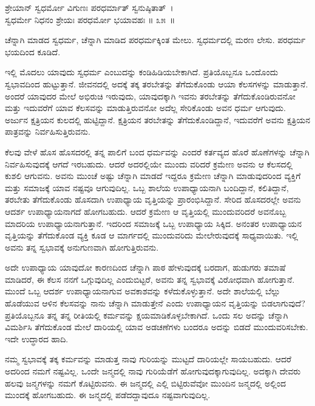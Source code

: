\begin{shloka}
ಶ್ರೇಯಾನ್ ಸ್ವಧರ್ಮೋ ವಿಗುಣಃ ಪರಧರ್ಮಾತ್ ಸ್ವನುಷ್ಠಿತಾತ್~।\\ಸ್ವಧರ್ಮೇ ನಿಧನಂ ಶ್ರೇಯಃ ಪರಧರ್ಮೋ ಭಯಾವಹಃ \hfill॥ ೩೫~॥
\end{shloka}

\newpage

\begin{artha}
ಚೆನ್ನಾಗಿ ಮಾಡದ ಸ್ವಧರ್ಮ, ಚೆನ್ನಾಗಿ ಮಾಡಿದ ಪರಧರ್ಮಕ್ಕಿಂತ ಮೇಲು. ಸ್ವಧರ್ಮದಲ್ಲಿ ಮರಣ ಲೇಸು. ಪರಧರ್ಮ ಭಯದಿಂದ ಕೂಡಿದೆ.
\end{artha}

ಇಲ್ಲಿ ಮೊದಲು ಯಾವುದು ಸ್ವಧರ್ಮ ಎಂಬುದನ್ನು ಕಂಡಿಹಿಡಿಯಬೇಕಾಗಿದೆ. ಪ್ರತಿ\-ಯೊಬ್ಬನೂ ಒಂದೊಂದು ಸ್ವಭಾವದಿಂದ ಹುಟ್ಟುತ್ತಾನೆ. ಜೀವನದಲ್ಲಿ ಅದಕ್ಕೆ ತಕ್ಕ ತರಬೇತನ್ನು ತೆಗೆದುಕೊಂಡು ಆಯಾ ಕೆಲಸಗಳನ್ನು ಮಾಡುತ್ತಾನೆ. ಅಂದರೆ ಯಾವುದರ ಮೇಲೆ ಅಭಿರುಚಿ ಇರುವುದು, ಯಾವುದಕ್ಕಾಗಿ ಇವನು ತರಬೇತನ್ನು ತೆಗೆದುಕೊಂಡಿರುವನೋ ಮತ್ತು ಇದುವರೆಗೆ ಯಾವ ಕೆಲಸವನ್ನು ಮಾಡುತ್ತಿರುವನೋ ಅದೆಲ್ಲ ಸೇರಿಕೊಂಡು ಅವನ ಧರ್ಮ ಆಗುವುದು. ಅರ್ಜುನ ಕ್ಷತ್ರಿಯನ ಕುಲದಲ್ಲಿ ಹುಟ್ಟಿದ್ದಾನೆ. ಕ್ಷತ್ರಿಯನ ತರಬೇತನ್ನು ತೆಗೆದುಕೊಂಡಿದ್ದಾನೆ, ಇದುವರೆಗೆ ಅವನು ಕ್ಷತ್ರಿಯನ ಪಾತ್ರವನ್ನು ನಿರ್ವಹಿಸುತ್ತಿರುವನು.

ಕೆಲವು ವೇಳೆ ಹೊಸ ಹೊಸದರಲ್ಲಿ ತನ್ನ ಪಾಲಿಗೆ ಬಂದ ಧರ್ಮವನ್ನು ಎಂದರೆ ಕರ್ತವ್ಯದ ಹೊರೆ ಹೊಣೆಗಳನ್ನು ಚೆನ್ನಾಗಿ ನಿರ್ವಹಿಸುವುದಕ್ಕೆ ಆಗದೆ ಇರಬಹುದು. ಆದರೆ ಅದರಲ್ಲಿಯೇ ಮುಂದು ವರಿದರೆ ಕ್ರಮೇಣ ಅವನು ಆ ಕೆಲಸದಲ್ಲಿ ಕುಶಲಿ ಆಗುವನು. ಅವನು ಮುಂಚೆ ಅಷ್ಟು ಚೆನ್ನಾಗಿ ಮಾಡದೆ ಇದ್ದರೂ ಕ್ರಮೇಣ ಚೆನ್ನಾಗಿ ಮಾಡುವುದರಿಂದ ವ್ಯಕ್ತಿಗೆ ಮತ್ತು ಸಮಾಜಕ್ಕೆ ಯಾವ ನಷ್ಟವೂ ಆಗುವುದಿಲ್ಲ. ಒಬ್ಬ ಶಾಲೆಯ ಉಪಾಧ್ಯಾಯನಾಗಿ ಬಂದಿದ್ದಾನೆ, ಕಲಿತಿದ್ದಾನೆ, ತರಬೇತು ತೆಗೆದುಕೊಂಡು ಹೊಸದಾಗಿ ಉಪಾಧ್ಯಾಯ ವೃತ್ತಿಯನ್ನು ಪ್ರಾರಂಭಿಸಿದ್ದಾನೆ. ಸೇರಿದ ಹೊಸದರಲ್ಲೇ ಅವನು ಆದರ್ಶ ಉಪಾಧ್ಯಾಯನಾಗದೆ ಹೋಗಬಹುದು. ಆದರೆ ಕ್ರಮೇಣ ಆ ವೃತ್ತಿಯಲ್ಲಿ ಮುಂದುವರಿದರೆ ಅವನೊಬ್ಬ ಮಾದರಿಯ ಉಪಾಧ್ಯಾಯನಾಗುತ್ತಾನೆ. ಇದರಿಂದ ಸಮಾಜಕ್ಕೆ ಒಬ್ಬ ಉಪಾಧ್ಯಾಯ ಸಿಕ್ಕಿದ. ಅನಂತರ ಉಪಾಧ್ಯಾಯನ ವೃತ್ತಿಯನ್ನು ತೆಗೆದುಕೊಂಡ ವ್ಯಕ್ತಿ ಕೂಡ ಆ ಮಾರ್ಗದಲ್ಲಿ ಮುಂದುವರಿದು ಮೇಲೇರುವುದಕ್ಕೆ ಸಾಧ್ಯವಾಯಿತು. ಇಲ್ಲಿ ಅವನು ತನ್ನ ಸ್ವಭಾವಕ್ಕೆ ಅನುಗುಣವಾಗಿ ಹೋಗುತ್ತಿರುವನು.

ಅದೇ ಉಪಾಧ್ಯಾಯ ಯಾವುದೋ ಕಾರಣದಿಂದ ಚೆನ್ನಾಗಿ ಪಾಠ ಹೇಳುವುದಕ್ಕೆ ಬರದಾಗ, ಹುಡುಗರು ತಮಾಷೆ ಮಾಡಿದರೆ, ಈ ಕೆಲಸ ನನಗೆ ಒಗ್ಗುವುದಿಲ್ಲ ಎಂದುಬಿಟ್ಟರೆ, ಅವನು ತನ್ನ ಸ್ವಭಾವಕ್ಕೆ ವಿರೋಧವಾಗಿ ಹೋಗುತ್ತಾನೆ. ಮುಂದೆ ಒಬ್ಬ ಆದರ್ಶ ಉಪಾಧ್ಯಾಯನಾಗುವ ಅವಕಾಶವನ್ನು ಕಳೆದುಕೊಳ್ಳುತ್ತಾನೆ. ಅದೇ ಶಾಲೆಯಲ್ಲಿ ಬೆಲ್ಲು ಹೊಡೆಯುವ ಆಳಿನ ಕೆಲಸವನ್ನು ನಾನು ಚೆನ್ನಾಗಿ ಮಾಡುತ್ತೇನೆ ಎಂದು ಉಪಾಧ್ಯಾಯನ ವೃತ್ತಿಯನ್ನು ಬಿಡಲಾಗುವುದೆ? ಪ್ರತಿಯೊಬ್ಬನೂ ತನ್ನ ತನ್ನ ರೀತಿಯಲ್ಲಿ ಕರ್ಮವನ್ನು ಕ್ಷಯಮಾಡಿಕೊಳ್ಳಬೇಕಾಗಿದೆ. ಒಂದು ಸಲ ಅದನ್ನು ಚೆನ್ನಾಗಿ ವಿಮರ್ಶಿಸಿ ತೆಗೆದುಕೊಂಡ ಮೇಲೆ ದಾರಿಯಲ್ಲಿ ಯಾವ ಅಡಚಣೆಗಳು ಬಂದರೂ ಅದನ್ನು ಬಿಡದೆ ಮುಂದುವರಿಸಬೇಕು. ಇದೇ ಉದ್ಧಾರದ ಹಾದಿ.

ನಮ್ಮ ಸ್ವಭಾವಕ್ಕೆ ತಕ್ಕ ಕರ್ಮವನ್ನು ಮಾಡುತ್ತ ನಾವು ಗುರಿಯನ್ನು ಮುಟ್ಟದೆ ದಾರಿಯಲ್ಲೇ ಸಾಯಬಹುದು. ಆದರೆ ಅದರಿಂದ ನಮಗೆ ನಷ್ಟವಿಲ್ಲ. ಒಂದೇ ಜನ್ಮದಲ್ಲಿ ನಾವು ಗುರಿಯೆಡೆಗೆ ಹೋಗುವುದಕ್ಕಾಗುವುದಿಲ್ಲ. ಅದಕ್ಕಾಗಿ ದೇವರು ಹಲವು ಜನ್ಮಗಳನ್ನು ನಮಗೆ ಕೊಟ್ಟಿರುವನು. ಈ ಜನ್ಮದಲ್ಲಿ ಎಲ್ಲಿ ಬಿಟ್ಟಿರುವೆವೋ ಮುಂದಿನ ಜನ್ಮದಲ್ಲಿ ಅಲ್ಲಿಂದ ಮುಂದಕ್ಕೆ ಹೋಗಬಹುದು. ಈ ಜನ್ಮದಲ್ಲಿ ಪಡೆದದ್ದಾವುದೂ ನಷ್ಟವಾಗುವುದಿಲ್ಲ.

